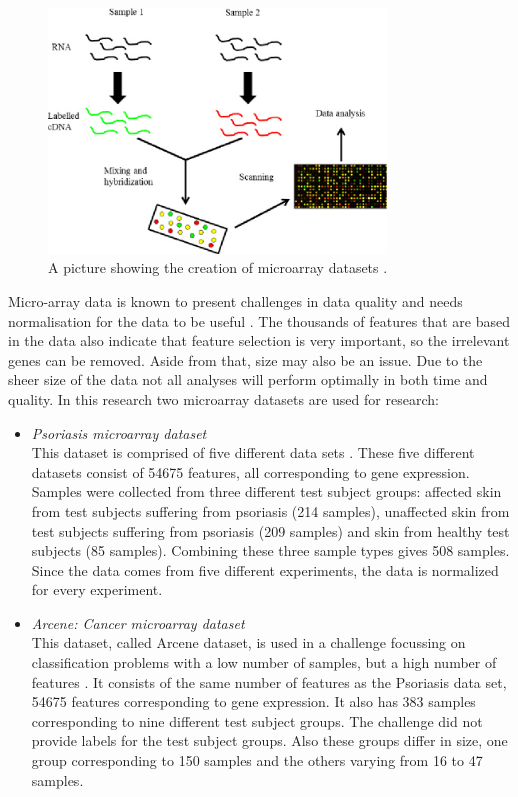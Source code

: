 \documentclass[10pt,a4paper]{report}
\begin{document}
	\begin{figure}
		\includegraphics[width=0.8\textwidth]{MicroArray.png}
		\caption{A picture showing the creation of microarray datasets \cite{afzal2015fast}.}
		\label{fig:MicroArray}
	\end{figure}
	
	Micro-array data is known to present challenges in data quality and needs normalisation for the data to be useful \cite{selvaraj2011microarray}. The thousands of features that are based in the data also indicate that feature selection is very important, so the irrelevant genes can be removed. Aside from that, size may also be an issue. Due to the sheer size of the data not all analyses will perform optimally in both time and quality. In this research two microarray datasets are used for research:
	
	\begin{itemize}
		\item \textit{Psoriasis microarray dataset} \\ This dataset is comprised of five different data sets \cite{nair2009genome, suarez2012expanding, bigler2013cross, yao2008type}. These five different datasets consist of 54675 features, all corresponding to gene expression. Samples were collected from three different test subject groups: affected skin from test subjects suffering from psoriasis (214 samples), unaffected skin from test subjects suffering from psoriasis (209 samples) and skin from healthy test subjects (85 samples). Combining these three sample types gives 508 samples. Since the data comes from five different experiments, the data is normalized for every experiment.
		\item \textit{Arcene: Cancer microarray dataset} \\ This dataset, called Arcene dataset, is used in a challenge focussing on classification problems with a low number of samples, but a high number of features \cite{wojnarski2010rsctc}. It consists of the same number of features as the Psoriasis data set, 54675 features corresponding to gene expression. It also has 383 samples corresponding to nine different test subject groups. The challenge did not provide labels for the test subject groups. Also these groups differ in size, one group corresponding to 150 samples and the others varying from 16 to 47 samples.
	\end{itemize}
	
\end{document}
